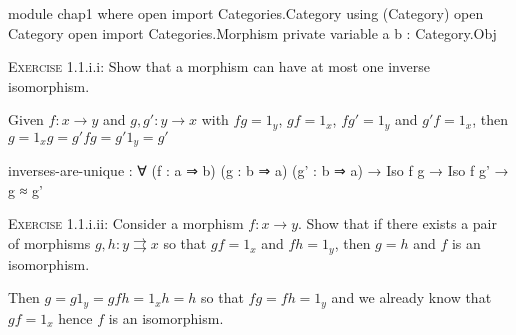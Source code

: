 \documentclass[12pt]{article}
\begin{document}
\begin{code}
module chap1 where
open import Categories.Category using (Category)
open Category
open import Categories.Morphism
private
  variable
    a b : Category.Obj
\end{code}

\textsc{Exercise} 1.1.i.i: Show that a morphism can have at most one inverse isomorphism.
\vspace{10pt}

Given \(f:x→y\) and \(g,g':y→x\) with \(fg=1_y\), \(gf= 1_x\), \(fg' = 1_y\) and \(g'f=1_x\), then \(g=1_xg=g'fg=g'1_y=g'\)

\begin{code}
inverses-are-unique : ∀ (f : a ⇒ b) (g : b ⇒ a) (g' : b ⇒ a) → Iso f g → Iso f g' → g ≈ g'
\end{code}

\textsc{Exercise} 1.1.i.ii: Consider a morphism \(f: x → y\). Show  that if there exists a pair of morphisms \(g,h:y\rightrightarrows x\) so that \(gf=1_x\) and \(fh=1_y\), then \(g = h\) and \(f\) is an isomorphism.
\vspace{10pt}

Then \(g = g1_y = gfh = 1_xh = h\) so that \(fg = fh = 1_y\) and we already know that \(gf = 1_x\) hence \(f\) is an isomorphism.
\end{document}

